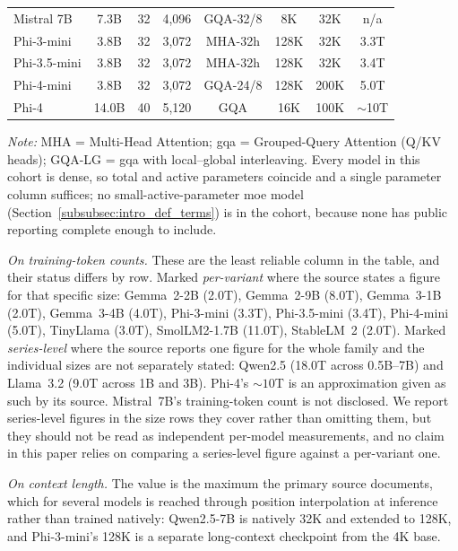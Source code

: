 \begin{table}[ht]
{\begin{tabular}{lccccccc}
Mistral 7B & 7.3B & 32 & 4,096 & GQA-32/8 & 8K & 32K & n/a \\
Phi-3-mini & 3.8B & 32 & 3,072 & MHA-32h & 128K & 32K & 3.3T \\
Phi-3.5-mini & 3.8B & 32 & 3,072 & MHA-32h & 128K & 32K & 3.4T \\
Phi-4-mini & 3.8B & 32 & 3,072 & GQA-24/8 & 128K & 200K & 5.0T \\
Phi-4 & 14.0B & 40 & 5,120 & GQA & 16K & 100K & $\sim$10T \\
\bottomrule
\end{tabular}%
}\par\vskip 4pt\relax
{\raggedright \small \textit{Note:} MHA = Multi-Head Attention; \gls{gqa} = Grouped-Query Attention (Q/KV heads); GQA-LG = \gls{gqa} with local--global interleaving. Every model in this cohort is dense, so total and active parameters coincide and a single parameter column suffices; no small-active-parameter \gls{moe} model (Section~\ref{subsubsec:intro_def_terms}) is in the cohort, because none has public reporting complete enough to include.

\textit{On training-token counts.} These are the least reliable column in the
table, and their status differs by row. Marked \emph{per-variant} where the
source states a figure for that specific size: Gemma~2-2B (2.0T), Gemma~2-9B
(8.0T), Gemma~3-1B (2.0T), Gemma~3-4B (4.0T), Phi-3-mini (3.3T), Phi-3.5-mini
(3.4T), Phi-4-mini (5.0T), TinyLlama (3.0T), SmolLM2-1.7B (11.0T), StableLM~2
(2.0T). Marked \emph{series-level} where the source reports one figure for the
whole family and the individual sizes are not separately stated: Qwen2.5
(18.0T across 0.5B--7B) and Llama~3.2 (9.0T across 1B and 3B). Phi-4's
${\sim}10$T is an approximation given as such by its source. Mistral~7B's
training-token count is not disclosed. We report series-level figures in the
size rows they cover rather than omitting them, but they should not be read as
independent per-model measurements, and no claim in this paper relies on
comparing a series-level figure against a per-variant one.

\textit{On context length.} The value is the maximum the primary source
documents, which for several models is reached through position interpolation at
inference rather than trained natively: Qwen2.5-7B is natively 32K and extended
to 128K, and Phi-3-mini's 128K is a separate long-context checkpoint from the 4K
base.\par}
\end{table}

